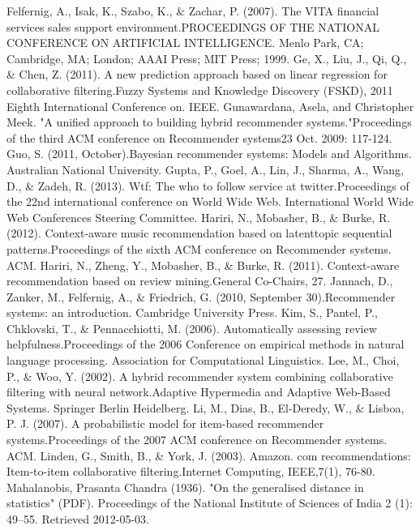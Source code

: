 \documentclass[12pt]{article}
\begin{document}
\begin{thebibliography}{100}
 Felfernig, A., Isak, K., Szabo, K., \& Zachar, P. (2007). The VITA financial services sales support environment.PROCEEDINGS OF THE NATIONAL CONFERENCE ON ARTIFICIAL INTELLIGENCE. Menlo Park, CA; Cambridge, MA; London; AAAI Press; MIT Press; 1999.
 Ge, X., Liu, J., Qi, Q., \& Chen, Z. (2011). A new prediction approach based on linear regression for collaborative filtering.Fuzzy Systems and Knowledge Discovery (FSKD), 2011 Eighth International Conference on. IEEE.
 Gunawardana, Asela, and Christopher Meek. "A unified approach to building hybrid recommender systems."Proceedings of the third ACM conference on Recommender systems23 Oct. 2009: 117-124.
 Guo, S. (2011, October).Bayesian recommender systems: Models and Algorithms. Australian National University.
 Gupta, P., Goel, A., Lin, J., Sharma, A., Wang, D., \& Zadeh, R. (2013). Wtf: The who to follow service at twitter.Proceedings of the 22nd international conference on World Wide Web. International World Wide Web Conferences Steering Committee.
 Hariri, N., Mobasher, B., \& Burke, R. (2012). Context-aware music recommendation based on latenttopic sequential patterns.Proceedings of the sixth ACM conference on Recommender systems. ACM.
 Hariri, N., Zheng, Y., Mobasher, B., \& Burke, R. (2011). Context-aware recommendation based on review mining.General Co-Chairs, 27.
 Jannach, D., Zanker, M., Felfernig, A., \& Friedrich, G. (2010, September 30).Recommender systems: an introduction. Cambridge University Press.
 Kim, S., Pantel, P., Chklovski, T., \& Pennacchiotti, M. (2006). Automatically assessing review helpfulness.Proceedings of the 2006 Conference on empirical methods in natural language processing. Association for Computational Linguistics.
 Lee, M., Choi, P., \& Woo, Y. (2002). A hybrid recommender system combining collaborative filtering with neural network.Adaptive Hypermedia and Adaptive Web-Based Systems. Springer Berlin Heidelberg.
 Li, M., Dias, B., El-Deredy, W., \& Lisboa, P. J. (2007). A probabilistic model for item-based recommender systems.Proceedings of the 2007 ACM conference on Recommender systems. ACM.
 Linden, G., Smith, B., \& York, J. (2003). Amazon. com recommendations: Item-to-item collaborative filtering.Internet Computing, IEEE,7(1), 76-80.
 Mahalanobis, Prasanta Chandra (1936). "On the generalised distance in statistics" (PDF). Proceedings of the National Institute of Sciences of India 2 (1): 49–55. Retrieved 2012-05-03.

\end{thebibliography}
\end{document}
